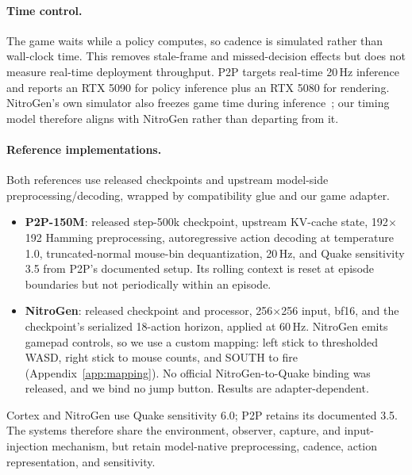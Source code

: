 \documentclass[11pt]{article}
\newcommand{\x}{\ensuremath{\times}}
\begin{document}
\paragraph{Time control.} The game waits while a policy computes, so cadence is simulated rather than wall-clock time. This removes stale-frame and missed-decision effects but does not measure real-time deployment throughput. P2P targets real-time 20\,Hz inference and reports an RTX 5090 for policy inference plus an RTX 5080 for rendering. NitroGen's own simulator also freezes game time during inference~\cite{nitrogen}; our timing model therefore aligns with NitroGen rather than departing from it.

\paragraph{Reference implementations.} Both references use released checkpoints and upstream model-side preprocessing/decoding, wrapped by compatibility glue and our game adapter.
\begin{itemize}
\item \textbf{P2P-150M}: released step-500k checkpoint, upstream KV-cache state, 192\x192 Hamming preprocessing, autoregressive action decoding at temperature 1.0, truncated-normal mouse-bin dequantization, 20\,Hz, and Quake sensitivity 3.5 from P2P's documented setup. Its rolling context is reset at episode boundaries but not periodically within an episode.
\item \textbf{NitroGen}: released checkpoint and processor, 256\x256 input, bf16, and the checkpoint's serialized 18-action horizon, applied at 60\,Hz. NitroGen emits gamepad controls, so we use a custom mapping: left stick to thresholded WASD, right stick to mouse counts, and SOUTH to fire (Appendix~\ref{app:mapping}). No official NitroGen-to-Quake binding was released, and we bind no jump button. Results are adapter-dependent.
\end{itemize}
Cortex and NitroGen use Quake sensitivity 6.0; P2P retains its documented 3.5. The systems therefore share the environment, observer, capture, and input-injection mechanism, but retain model-native preprocessing, cadence, action representation, and sensitivity.
\end{document}
